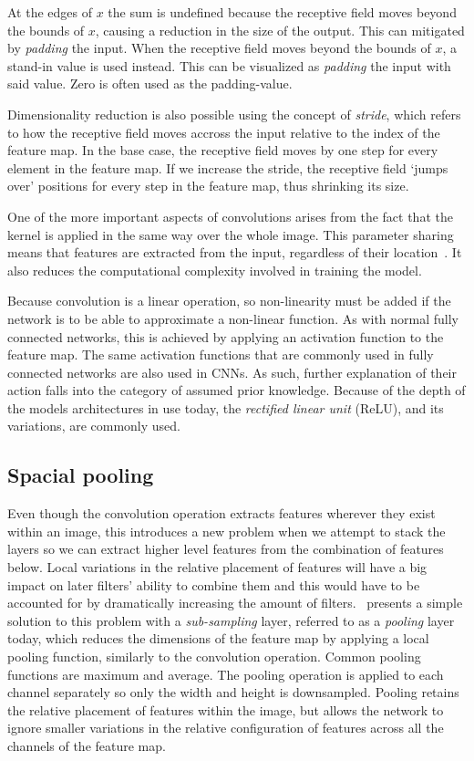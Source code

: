 At the edges of \(x\) the sum is undefined because the receptive field moves beyond the bounds of \(x\), causing a reduction in the size of the output.
This can mitigated by \textit{padding} the input.
When the receptive field moves beyond the bounds of \(x\), a stand-in value is used instead.
This can be visualized as \textit{padding} the input with said value.
Zero is often used as the padding-value.

Dimensionality reduction is also possible using the concept of \textit{stride}, which refers to how the receptive field moves accross the input relative to the index of the feature map.
In the base case, the receptive field moves by one step for every element in the feature map.
If we increase the stride, the receptive field `jumps over' positions for every step in the feature map, thus shrinking its size. 

One of the more important aspects of convolutions arises from the fact that the kernel is applied in the same way over the whole image.
This parameter sharing means that features are extracted from the input, regardless of their location~\parencite{lecum1989}.
It also reduces the computational complexity involved in training the model.

Because convolution is a linear operation, so non-linearity must be added if the network is to be able to approximate a non-linear function.
As with normal fully connected networks, this is achieved by applying an activation function to the feature map.
The same activation functions that are commonly used in fully connected networks are also used in CNNs.
As such, further explanation of their action falls into the category of assumed prior knowledge.
Because of the depth of the models architectures in use today, the \textit{rectified linear unit} (ReLU), and its variations, are commonly used.

\subsection{Spacial pooling}
Even though the convolution operation extracts features wherever they exist within an image, this introduces a new problem when we attempt to stack the layers so we can extract higher level features from the combination of features below.
Local variations in the relative placement of features will have a big impact on later filters' ability to combine them and this would have to be accounted for by dramatically increasing the amount of filters.~\cite{lecun1998gradient} presents a simple solution to this problem with a \textit{sub-sampling} layer, referred to as a \textit{pooling} layer today, which reduces the dimensions of the feature map by applying a local pooling function, similarly to the convolution operation.
Common pooling functions are maximum and average.
The pooling operation is applied to each channel separately so only the width and height is downsampled.
Pooling retains the relative placement of features within the image, but allows the network to ignore smaller variations in the relative configuration of features across all the channels of the feature map.

